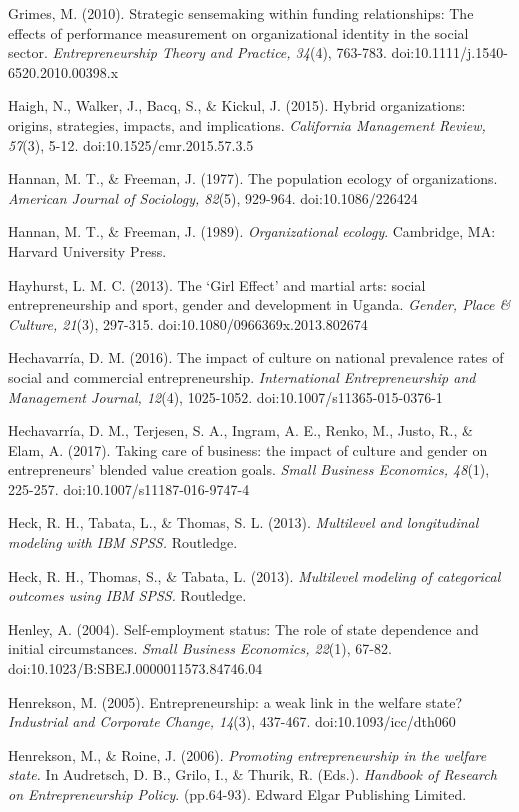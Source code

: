 \documentclass{article}
\begin{document}
Grimes, M. (2010). Strategic sensemaking within funding relationships: The effects of performance measurement on organizational identity in the social sector. \emph{Entrepreneurship Theory and Practice, 34}(4), 763-783. doi:10.1111/j.1540-6520.2010.00398.x

Haigh, N., Walker, J., Bacq, S., \& Kickul, J. (2015). Hybrid organizations: origins, strategies, impacts, and implications. \emph{California Management Review, 57}(3), 5-12. doi:10.1525/cmr.2015.57.3.5

Hannan, M. T., \& Freeman, J. (1977). The population ecology of organizations. \emph{American Journal of Sociology, 82}(5), 929-964. doi:10.1086/226424

Hannan, M. T., \& Freeman, J. (1989). \emph{Organizational ecology}. Cambridge, MA: Harvard University Press.

Hayhurst, L. M. C. (2013). The ‘Girl Effect' and martial arts: social entrepreneurship and sport, gender and development in Uganda. \emph{Gender, Place \& Culture, 21}(3), 297-315. doi:10.1080/0966369x.2013.802674

Hechavarría, D. M. (2016). The impact of culture on national prevalence rates of social and commercial entrepreneurship. \emph{International Entrepreneurship and Management Journal, 12}(4), 1025-1052. doi:10.1007/s11365-015-0376-1

Hechavarría, D. M., Terjesen, S. A., Ingram, A. E., Renko, M., Justo, R., \& Elam, A. (2017). Taking care of business: the impact of culture and gender on entrepreneurs' blended value creation goals. \emph{Small Business Economics, 48}(1), 225-257. doi:10.1007/s11187-016-9747-4

Heck, R. H., Tabata, L., \& Thomas, S. L. (2013). \emph{Multilevel and longitudinal }\emph{modeling}\emph{ with IBM SPSS.} Routledge.

Heck, R. H., Thomas, S., \& Tabata, L. (2013). \emph{Multilevel }\emph{modeling}\emph{ of categorical outcomes using IBM SPSS.} Routledge.

Henley, A. (2004). Self-employment status: The role of state dependence and initial circumstances. \emph{Small Business Economics, 22}(1), 67-82. doi:10.1023/B:SBEJ.0000011573.84746.04

Henrekson, M. (2005). Entrepreneurship: a weak link in the welfare state? \emph{Industrial and Corporate Change, 14}(3), 437-467. doi:10.1093/icc/dth060

Henrekson, M., \& Roine, J. (2006). \emph{Promoting entrepreneurship in the welfare state.} In Audretsch, D. B., Grilo, I., \& Thurik, R. (Eds.). \emph{Handbook of Research on Entrepreneurship Policy}. (pp.64-93). Edward Elgar Publishing Limited.
\end{document}
